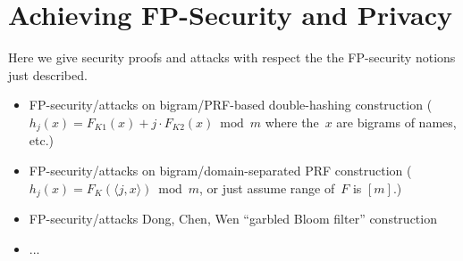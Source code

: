 \section{Achieving FP-Security and Privacy}
  Here we give security proofs and attacks with respect the the FP-security notions just described.
\begin{itemize}
\item FP-security/attacks on bigram/PRF-based double-hashing construction ($h_j(x) = F_{K1}(x) + j\cdot F_{K2}(x) \bmod m$ where the~$x$ are bigrams of names, etc.) 
\item FP-security/attacks on bigram/domain-separated PRF construction ($h_j(x)=F_K(\langle j,x \rangle) \bmod m$, or just assume range of~$F$ is $[m]$.)
\item FP-security/attacks Dong, Chen, Wen ``garbled Bloom filter'' construction
\item ...
\end{itemize}

